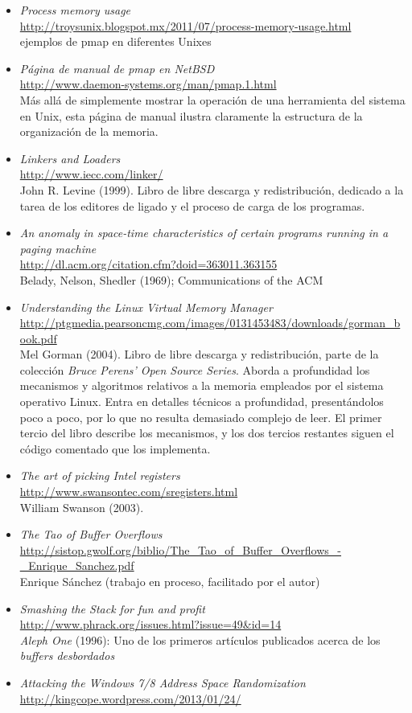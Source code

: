 \documentclass[11pt,fleqn]{book} %
\newcommand{\otrorec}[1]{ \\ {\small \url{#1}} \\ }
\begin{document}
\begin{itemize}
\item \emph{Process memory usage}
  \otrorec{http://troysunix.blogspot.mx/2011/07/process-memory-usage.html}
  ejemplos de pmap en diferentes Unixes
\item \emph{Página de manual de pmap en NetBSD}
  \otrorec{http://www.daemon-systems.org/man/pmap.1.html}
  Más allá de
  simplemente mostrar la operación de una herramienta del sistema en
  Unix, esta página de manual ilustra claramente la estructura de la
  organización de la memoria.
\item \emph{Linkers and Loaders}
  \otrorec{http://www.iecc.com/linker/}
  John R. Levine
  (1999). Libro de libre descarga y redistribución, dedicado a la
  tarea de los editores de ligado y el proceso de carga de los
  programas.
\item \emph{An anomaly in space-time characteristics of certain programs   running in a paging machine}
  \otrorec{http://dl.acm.org/citation.cfm?doid=363011.363155}
  Belady, Nelson,
  Shedler (1969); Communications of the ACM
\item \emph{Understanding the Linux Virtual Memory Manager}
  \otrorec{http://ptgmedia.pearsoncmg.com/images/0131453483/downloads/gorman_book.pdf}
  Mel Gorman (2004).  Libro de libre descarga y redistribución, parte
  de la colección \emph{Bruce Perens' Open Source Series}.  Aborda a
  profundidad los mecanismos y algoritmos relativos a la memoria
  empleados por el sistema operativo Linux. Entra en detalles técnicos
  a profundidad, presentándolos poco a poco, por lo que no resulta
  demasiado complejo de leer. El primer tercio del libro describe los
  mecanismos, y los dos tercios restantes siguen el código comentado
  que los implementa.
\item \emph{The art of picking Intel registers}
  \otrorec{http://www.swansontec.com/sregisters.html}
  William Swanson (2003).
\item \emph{The Tao of Buffer Overflows}
  \otrorec{http://sistop.gwolf.org/biblio/The_Tao_of_Buffer_Overflows_-_Enrique_Sanchez.pdf}
  Enrique Sánchez (trabajo en proceso, facilitado por el autor)
\item \emph{Smashing the Stack for fun and profit}
  \otrorec{http://www.phrack.org/issues.html?issue=49&id=14}
  \emph{Aleph One} (1996): Uno de los primeros artículos publicados acerca de los
  \emph{buffers desbordados}
\item \emph{Attacking the Windows 7/8 Address Space Randomization}
  \otrorec{http://kingcope.wordpress.com/2013/01/24/}

\end{itemize}
\end{document}
